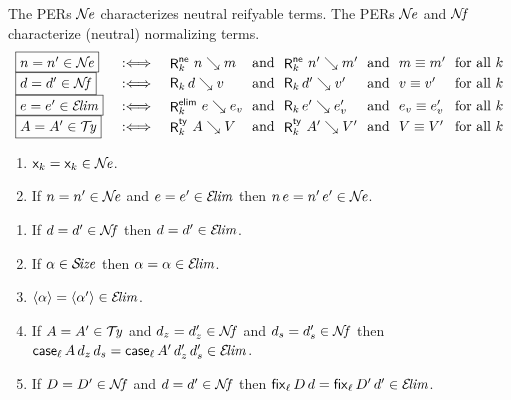 \documentclass[acmlarge,review,anonymous]{acmart}\settopmatter{printfolios=true}
\begin{document}
The PERs $\NE$ characterizes neutral reifyable terms.
The PERs $\NE$ and $\NF$ characterize (neutral) normalizing terms.
\[
\begin{array}{l@{\quad}l@{\quad}l@{~}l@{~}l@{~}l@{~}l@{~}l}
  \fbox{$n = n' \in \NE$}
    & \defas &
    \RNe k n m &\mand& \RNe k {n'} {m'} &\mand& m \nfeq m' &\mforall k \\
  \fbox{$d = d' \in \NF$}
    & \defas &
    \R k d v &\mand& \R k {d'} {v'} &\mand& v \nfeq v' &\mforall k \\
  \fbox{$e = e' \in \ELIM$}
    & \defas &
    \RElim k e e_v &\mand& \R k {e'} {e_v'} &\mand& e_v \nfeq e_v' &\mforall k \\
  \fbox{$A = A' \in \TY$}
    & \defas &
    \RTy k A V &\mand& \RTy k {A'} {V'} &\mand& V \nfeq V' &\mforall k \\
\end{array}
\]

\begin{lemma}
  \label{lem:closne}
  \bla
  \begin{enumerate}
  \item $\lev k = \lev k \in \NE$.
  \item If $n = n' \in \NE$ and $e = e' \in \ELIM$ then $n\,e = n'\,e' \in \NE$.
  \end{enumerate}
\end{lemma}

\begin{lemma}
  \label{lem:closelim}
  \bla
  \begin{enumerate}
  \item If $d = d' \in \NF$ then $d = d' \in \ELIM$.
  \item If $\alpha \in \SIZE$ then $\alpha = \alpha \in \ELIM$.
  \item $\ann \alpha = \ann{\alpha'} \in \ELIM$.
  \item If $A = A' \in \TY$ and $d_z = d_z' \in \NF$ and $d_s = d_s' \in \NF$
        then $\case[\ell] A {d_z}{d_s} = \case[\ell]{A'}{d_z'}{d_s'} \in \ELIM$.
  \item If $D = D' \in \NF$ and $d = d' \in \NF$ then $\fix[\ell] D d = \fix[\ell]{D'}{d'} \in \ELIM$.
  \end{enumerate}
\end{lemma}
\end{document}
